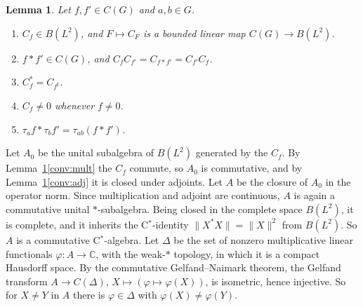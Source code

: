 \documentclass[11pt]{article}
\newtheorem{lemma}[theorem]{Lemma}
\newcommand{\C}{\mathbb{C}}
\begin{document}
\begin{lemma}\label{lem:conv}
Let $f, f' \in C(G)$ and $a, b \in G$.
\begin{enumerate}[label=(\roman*),ref=(\roman*)]
  \item\label{conv:bdd} $C_f \in B(L^2)$, and $F \mapsto C_F$ is a bounded linear map $C(G) \to B(L^2)$.
  \item\label{conv:mult} $f * f' \in C(G)$, and $C_f C_{f'} = C_{f*f'} = C_{f'} C_f$.
  \item\label{conv:adj} $C_f^* = C_{f^\sharp}$.
  \item\label{conv:nonzero} $C_f \neq 0$ whenever $f \neq 0$.
  \item\label{conv:transl} $\tau_a f * \tau_b f' = \tau_{ab}(f * f')$.
\end{enumerate}
\end{lemma}
Let $A_0$ be the unital subalgebra of $B(L^2)$ generated by the $C_f$. By Lemma~\ref{lem:conv}\ref{conv:mult} the $C_f$ commute, so $A_0$ is commutative, and by Lemma~\ref{lem:conv}\ref{conv:adj} it is closed under adjoints. Let $A$ be the closure of $A_0$ in the operator norm. Since multiplication and adjoint are continuous, $A$ is again a commutative unital $*$-subalgebra. Being closed in the complete space $B(L^2)$, it is complete, and it inherits the C$^*$-identity $\|X^*X\| = \|X\|^2$ from $B(L^2)$. So $A$ is a commutative C$^*$-algebra. Let $\Delta$ be the set of nonzero multiplicative linear functionals $\varphi\colon A \to \C$, with the weak-$*$ topology, in which it is a compact Hausdorff space. By the commutative Gelfand--Naimark theorem, the Gelfand transform $A \to C(\Delta)$, $X \mapsto (\varphi \mapsto \varphi(X))$, is isometric, hence injective. So for $X \neq Y$ in $A$ there is $\varphi \in \Delta$ with $\varphi(X) \neq \varphi(Y)$.
\end{document}

